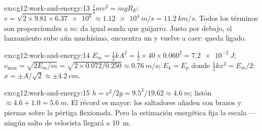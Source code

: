 \begin{solution}{exo:g12:work-and-energy:13}
$\tfrac12 mv^2 = mgR_E$:
$v = \sqrt{2 \times 9.81 \times \num{6.37e6}} \approx \qty{1.12e4}{m/s}
= \qty{11.2}{km/s}$. Todos los términos son proporcionales a $m$: da
igual sonda que guijarro. Justo por debajo, el lanzamiento sube aún
muchísimo, encuentra un  y vuelve a caer: queda ligado.
\end{solution}

\begin{solution}{exo:g12:work-and-energy:14}
$E_m = \tfrac12 kA^2 = \tfrac12 \times 40 \times 0.060^2 =
\qty{7.2e-2}{J}$;
$v_{\max} = \sqrt{2E_m/m} = \sqrt{2 \times 0.072/0.250} \approx
\qty{0.76}{m/s}$; $E_k = E_p$ donde $\tfrac12 kx^2 = E_m/2$:
$x = \pm A/\sqrt 2 \approx \pm\qty{4.2}{cm}$.
\end{solution}

\begin{solution}{exo:g12:work-and-energy:15}
$h = v^2/2g = 9.5^2/19.62 \approx \qty{4.6}{m}$; listón
$\approx 4.6 + 1.0 = \qty{5.6}{m}$. El récord es mayor: los saltadores
añaden  con brazos y piernas sobre la pértiga flexionada. Pero la
estimación energética fija la escala --- ningún salto de velocista
llegará a \qty{10}{m}.
\end{solution}

